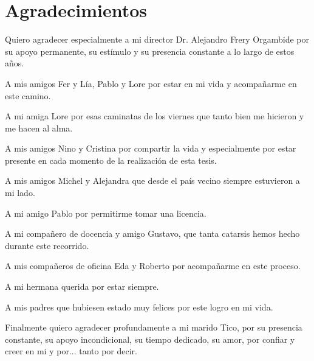
\chapter*{Agradecimientos}

Quiero agradecer especialmente a mi director Dr. Alejandro Frery Orgambide por su apoyo permanente, su estímulo y su presencia constante a lo largo de estos años. 

A mis amigos Fer y Lía, Pablo y Lore por estar en mi vida y acompañarme en este camino.

A mi amiga Lore por esas caminatas de los viernes que tanto bien me hicieron y me hacen al alma.

A mis amigos Nino y Cristina por compartir la vida y especialmente por estar presente en cada momento de la realización de esta tesis.

A mis amigos Michel y Alejandra que desde el país vecino siempre estuvieron a mi lado.

A mi amigo Pablo por permitirme tomar una licencia.

A mi compañero de docencia y amigo Gustavo, que tanta catarsis hemos hecho durante este recorrido.

A mis compañeros de oficina Eda y Roberto por acompañarme en este proceso. 

A mi hermana querida por estar siempre.

A mis padres que hubiesen estado muy felices por este logro en mi vida.

Finalmente quiero agradecer profundamente a mi marido Tico, por su presencia constante, su apoyo incondicional, su tiempo dedicado, su amor, por confiar y creer en mi y por... tanto por decir.

